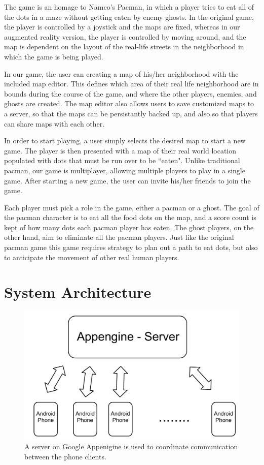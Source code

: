 \documentclass{acm_proc_article-sp}
\begin{document}
The game is an homage to Namco's Pacman, in which a player tries to eat all
of the dots in a maze without getting eaten by enemy ghosts. In the original
game, the player is controlled by a joystick and the maps are fixed, whereas
in our augmented reality version, the player is controlled by moving around,
and the map is dependent on the layout of the real-life streets in the
neighborhood in which the game is being played.


In our game, the user can creating a map of his/her neighborhood with
the included map editor.
This defines which area of their real life neighborhood are in bounds during
the course of the game, and where the other players, enemies, and ghosts are
created.
The map editor also allows users to save customized maps to a server,
so that the maps can be persistantly backed up, and also so that players
can share maps with each other.

In order to start playing, a user simply selects the desired map to start a new game. The player is then presented with a map of their real world location populated with dots that must be run over to be ``eaten". Unlike traditional pacman, our game is multiplayer, allowing multiple players to play in a single game.
After starting a new game, the user can invite his/her friends to join the
game.

Each player must pick a role in the game, either a pacman or a ghost. The
goal of the pacman character is to eat all the food dots on the map, and
a score count is kept of how many dots each pacman player has eaten.
The ghost players, on the other hand, aim to eliminate all the pacman players.
Just like the original pacman game this game requires strategy to plan out a
path to eat dots, but also to anticipate the movement of other real human
players.

\section{System Architecture}

\begin{figure}
\centering
\includegraphics[scale=0.4]{figs/ServerArchitecture}
\caption{A server on Google Appenigine is used to coordinate communication between the phone clients.}
\label{fig:ServerArchitecture}
\end{figure}
\end{document}

